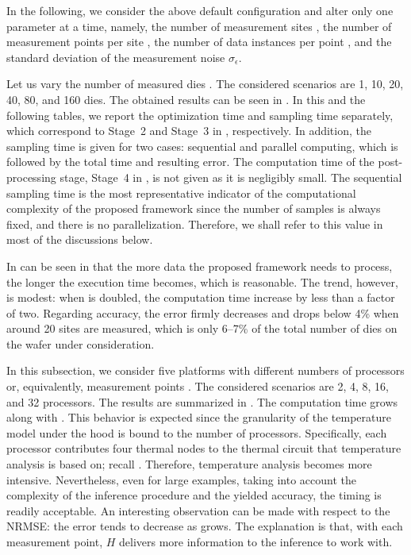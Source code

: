 In the following, we consider the above default configuration and alter only one
parameter at a time, namely, the number of measurement sites \ndm, the number of
measurement points per site \np, the number of data instances per point \ns, and
the standard deviation of the measurement noise $\sigma_\epsilon$.


Let us vary the number of measured dies \ndm. The considered scenarios are 1,
10, 20, 40, 80, and 160 dies. The obtained results can be seen in
. In this and the following tables, we report the
optimization time and sampling time separately, which correspond to Stage~2 and
Stage~3 in , respectively. In addition, the sampling
time is given for two cases: sequential and parallel computing, which is
followed by the total time and resulting error. The computation time of the
post-processing stage, Stage~4 in , is not given as it
is negligibly small. The sequential sampling time is the most representative
indicator of the computational complexity of the proposed framework since the
number of samples is always fixed, and there is no parallelization. Therefore,
we shall refer to this value in most of the discussions below.

In can be seen in  that the more data the proposed
framework needs to process, the longer the execution time becomes, which is
reasonable. The trend, however, is modest: when \ndm is doubled, the computation
time increase by less than a factor of two. Regarding accuracy, the error firmly
decreases and drops below 4\% when around 20 sites are measured, which is only
6--7\% of the total number of dies on the wafer under consideration.


In this subsection, we consider five platforms with different numbers of
processors or, equivalently, measurement points \np. The considered scenarios
are 2, 4, 8, 16, and 32 processors. The results are summarized in
. The computation time grows along with \np. This
behavior is expected since the granularity of the temperature model under the
hood is bound to the number of processors. Specifically, each processor
contributes four thermal nodes to the thermal  circuit that temperature
analysis is based on; recall . Therefore, temperature
analysis becomes more intensive. Nevertheless, even for large examples, taking
into account the complexity of the inference procedure and the yielded accuracy,
the timing is readily acceptable. An interesting observation can be made with
respect to the \ac{NRMSE}: the error tends to decrease as \np grows. The
explanation is that, with each measurement point, $H$ delivers more information
to the inference to work with.

